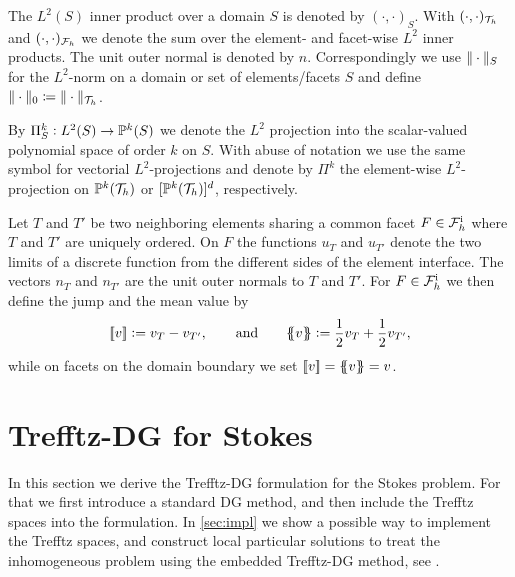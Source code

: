 \documentclass[pdflatex,sn-mathphys,Numbered]{sn-jnl}%
\theoremstyle{remark}%
\theoremstyle{definition}%
\begin{document}
The $L^2(S)$ inner product over a domain $S$ is denoted by
$(\cdot,\cdot)_S$. With $(\cdot,\cdot)_{\mathcal{T}_h}$ and $(\cdot,\cdot)_{\mathcal{F}_h}$ we
denote the sum over the element- and facet-wise $L^2$ inner products.
The unit outer normal is denoted by $n$. Correspondingly we use
$\Vert \cdot \Vert_S$ for the $L^2$-norm on a domain or set of
elements/facets $S$ and define $\Vert \cdot \Vert_0 \coloneqq
\Vert \cdot \Vert_{\mathcal{T}_h}$.  

By $\Pi^k_S: L^2(S) \to \mathbb{P}^k(S)$ we denote the $L^2$ projection into
the scalar-valued polynomial space of order $k$ on $S$. With abuse of
notation we use the same symbol for vectorial $L^2$-projections and
denote by $\Pi^k$ the element-wise $L^2$-projection on $\mathbb{P}^k({\mathcal{T}_h})$ or
$[\mathbb{P}^k({\mathcal{T}_h})]^d$, respectively.

Let $T$ and $T'$ be two neighboring elements sharing a common facet $F
\in {\mathcal{F}_h^{\text{i}}}$ where $T$ and $T'$ are uniquely ordered. On $F$ the
functions $u_{T}$ and $u_{T'}$ denote the two limits of a discrete
function from the different sides of the element interface. The
vectors $n_T$ and $n_{T'}$ are the unit outer normals to $T$ and $T'$.
For $F \in {\mathcal{F}_h^{\text{i}}}$ we then define the jump and the mean value by
\begin{equation*}
    [\![v]\!] := v_{T} - v_{T'}, \qquad \text{and} \qquad
    \{\!\!\{ v\}\!\!\} := \frac12 v_{T} + \frac12 v_{T'},
\end{equation*}
while on facets on the domain boundary we set $[\![v]\!] = \{\!\!\{ v\}\!\!\} =
v$.


\section{Trefftz-DG for Stokes}\label{sec:tdgstokes} In this section
we derive the Trefftz-DG formulation for the Stokes problem. For that
we first introduce a standard DG method, and then include the Trefftz
spaces into the formulation. In \cref{sec:impl} we show a possible way
to implement the Trefftz spaces, and construct local particular
solutions to treat the inhomogeneous problem using the embedded
Trefftz-DG method, see \cite{2201.07041}.
\end{document}
